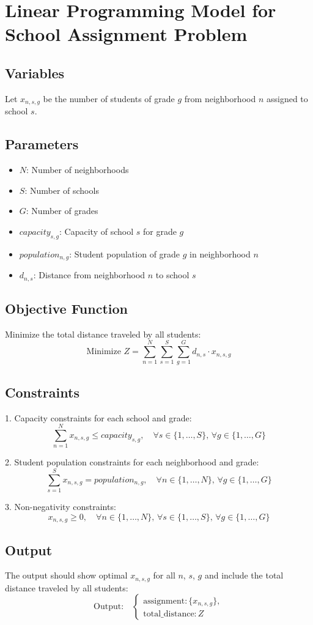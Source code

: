 \documentclass{article}
\begin{document}
\section*{Linear Programming Model for School Assignment Problem}

\subsection*{Variables}
Let \( x_{n,s,g} \) be the number of students of grade \( g \) from neighborhood \( n \) assigned to school \( s \).

\subsection*{Parameters}
\begin{itemize}
    \item \( N \): Number of neighborhoods
    \item \( S \): Number of schools
    \item \( G \): Number of grades
    \item \( capacity_{s,g} \): Capacity of school \( s \) for grade \( g \)
    \item \( population_{n,g} \): Student population of grade \( g \) in neighborhood \( n \)
    \item \( d_{n,s} \): Distance from neighborhood \( n \) to school \( s \)
\end{itemize}

\subsection*{Objective Function}
Minimize the total distance traveled by all students:
\[
\text{Minimize } Z = \sum_{n=1}^{N} \sum_{s=1}^{S} \sum_{g=1}^{G} d_{n,s} \cdot x_{n,s,g}
\]

\subsection*{Constraints}
1. Capacity constraints for each school and grade:
\[
\sum_{n=1}^{N} x_{n,s,g} \leq capacity_{s,g}, \quad \forall s \in \{1, \ldots, S\}, \, \forall g \in \{1, \ldots, G\}
\]

2. Student population constraints for each neighborhood and grade:
\[
\sum_{s=1}^{S} x_{n,s,g} = population_{n,g}, \quad \forall n \in \{1, \ldots, N\}, \, \forall g \in \{1, \ldots, G\}
\]

3. Non-negativity constraints:
\[
x_{n,s,g} \geq 0, \quad \forall n \in \{1, \ldots, N\}, \, \forall s \in \{1, \ldots, S\}, \, \forall g \in \{1, \ldots, G\}
\]

\subsection*{Output}
The output should show optimal \( x_{n,s,g} \) for all \( n \), \( s \), \( g \) and include the total distance traveled by all students:
\[
\text{Output:} \quad 
\begin{cases}
\text{assignment}: \{ x_{n,s,g} \}, \\
\text{total\_distance}: Z
\end{cases}
\]
\end{document}
